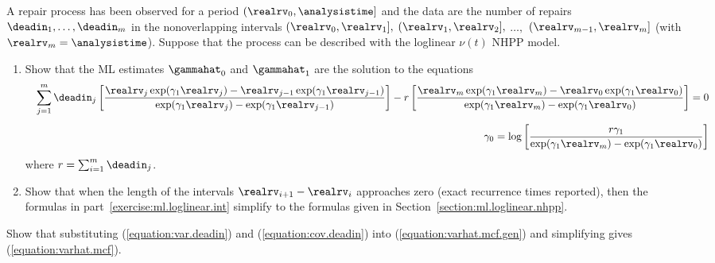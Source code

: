 \begin{exercise1}
A repair process has been observed for a period
$(\realrv_{0}, \analysistime]$ and the data are the number of repairs
$\deadin_{1},
\dots, \deadin_{m}$
in the nonoverlapping intervals $(\realrv_{0}, \realrv_{1}],$ $
(\realrv_{1}, \realrv_{2}],$ $ \dots,$ $ (\realrv_{m-1},
\realrv_{m}]$ (with $\realrv_{m}=\analysistime$). Suppose that the 
process can be described with the loglinear $\nu(t)$ NHPP model.
\begin{enumerate}
\item
\label{exercise:ml.loglinear.int}
Show that the ML estimates $\gammahat_{0}$ and $\gammahat_{1}$ are the
solution to the equations
\begin{eqnarray*}
&&\sum_{j=1}^{m} \deadin_{j}
\left [
\frac{
\realrv_{j} \exp(\gamma_{1}\realrv_{j} )-
\realrv_{j-1}\exp( \gamma_{1}\realrv_{j-1})
     } {
\exp(\gamma_{1} \realrv_{j} )-
\exp(\gamma_{1} \realrv_{j-1} )
     }
\right ] -
r \left [ \frac{
\realrv_{m} \exp(\gamma_{1}\realrv_{m} )-
\realrv_{0}\exp(\gamma_{1}\realrv_{0} )
	}
        {
 \exp(\gamma_{1} \realrv_{m} )-
 \exp(\gamma_{1} \realrv_{0})
	}
\right ]=0
\\[1ex]
&&
\gamma_{0}=
\log
\left [
\frac{
r \gamma_{1}
     }
     {
\exp(\gamma_{1} \realrv_{m})-\exp(\gamma_{1} \realrv_{0})
     }
\right ]
\end{eqnarray*}
where $r=\sum_{i=1}^{m}\deadin_{j}$.
\item
Show that when the length of the intervals $\realrv_{i+1}-\realrv_{i}$
approaches zero (exact recurrence times reported), then the formulas in 
part~\ref{exercise:ml.loglinear.int} simplify to
the formulas given in Section~\ref{section:ml.loglinear.nhpp}.
\end{enumerate}
\end{exercise1}


\begin{exercise}
Show that substituting (\ref{equation:var.deadin}) and
(\ref{equation:cov.deadin}) into (\ref{equation:varhat.mcf.gen}) and
simplifying gives (\ref{equation:varhat.mcf}).
\end{exercise}

